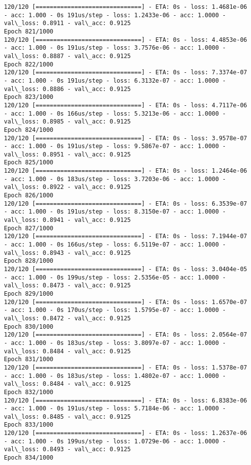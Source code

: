 \documentclass[11pt]{article}
\begin{document}
\begin{Verbatim}[commandchars=\\\{\}]
120/120 [==============================] - ETA: 0s - loss: 1.4681e-06 - acc: 1.000 - 0s 191us/step - loss: 1.2433e-06 - acc: 1.0000 - val\_loss: 0.8911 - val\_acc: 0.9125
Epoch 821/1000
120/120 [==============================] - ETA: 0s - loss: 4.4853e-06 - acc: 1.000 - 0s 191us/step - loss: 3.7576e-06 - acc: 1.0000 - val\_loss: 0.8887 - val\_acc: 0.9125
Epoch 822/1000
120/120 [==============================] - ETA: 0s - loss: 7.3374e-07 - acc: 1.000 - 0s 191us/step - loss: 6.3132e-07 - acc: 1.0000 - val\_loss: 0.8886 - val\_acc: 0.9125
Epoch 823/1000
120/120 [==============================] - ETA: 0s - loss: 4.7117e-06 - acc: 1.000 - 0s 166us/step - loss: 5.3213e-06 - acc: 1.0000 - val\_loss: 0.8985 - val\_acc: 0.9125
Epoch 824/1000
120/120 [==============================] - ETA: 0s - loss: 3.9578e-07 - acc: 1.000 - 0s 191us/step - loss: 9.5867e-07 - acc: 1.0000 - val\_loss: 0.8951 - val\_acc: 0.9125
Epoch 825/1000
120/120 [==============================] - ETA: 0s - loss: 1.2464e-06 - acc: 1.000 - 0s 183us/step - loss: 3.7203e-06 - acc: 1.0000 - val\_loss: 0.8922 - val\_acc: 0.9125
Epoch 826/1000
120/120 [==============================] - ETA: 0s - loss: 6.3539e-07 - acc: 1.000 - 0s 191us/step - loss: 8.3150e-07 - acc: 1.0000 - val\_loss: 0.8941 - val\_acc: 0.9125
Epoch 827/1000
120/120 [==============================] - ETA: 0s - loss: 7.1944e-07 - acc: 1.000 - 0s 166us/step - loss: 6.5119e-07 - acc: 1.0000 - val\_loss: 0.8943 - val\_acc: 0.9125
Epoch 828/1000
120/120 [==============================] - ETA: 0s - loss: 3.0404e-05 - acc: 1.000 - 0s 199us/step - loss: 2.5356e-05 - acc: 1.0000 - val\_loss: 0.8473 - val\_acc: 0.9125
Epoch 829/1000
120/120 [==============================] - ETA: 0s - loss: 1.6570e-07 - acc: 1.000 - 0s 170us/step - loss: 1.5795e-07 - acc: 1.0000 - val\_loss: 0.8472 - val\_acc: 0.9125
Epoch 830/1000
120/120 [==============================] - ETA: 0s - loss: 2.0564e-07 - acc: 1.000 - 0s 183us/step - loss: 3.8097e-07 - acc: 1.0000 - val\_loss: 0.8484 - val\_acc: 0.9125
Epoch 831/1000
120/120 [==============================] - ETA: 0s - loss: 1.5378e-07 - acc: 1.000 - 0s 183us/step - loss: 1.4802e-07 - acc: 1.0000 - val\_loss: 0.8484 - val\_acc: 0.9125
Epoch 832/1000
120/120 [==============================] - ETA: 0s - loss: 6.8383e-06 - acc: 1.000 - 0s 191us/step - loss: 5.7184e-06 - acc: 1.0000 - val\_loss: 0.8485 - val\_acc: 0.9125
Epoch 833/1000
120/120 [==============================] - ETA: 0s - loss: 1.2637e-06 - acc: 1.000 - 0s 199us/step - loss: 1.0729e-06 - acc: 1.0000 - val\_loss: 0.8493 - val\_acc: 0.9125
Epoch 834/1000

\end{Verbatim}
\end{document}
